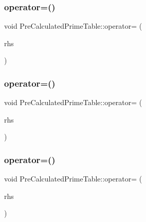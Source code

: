 \subsubsection{\texorpdfstring{operator=()}{operator=()}\hspace{0.1cm}{\footnotesize\ttfamily [1/3]}}
{\footnotesize\ttfamily void Pre\+Calculated\+Prime\+Table\+::operator= (\begin{DoxyParamCaption}\item[{const \mbox{\hyperlink{class_pre_calculated_prime_table}{Pre\+Calculated\+Prime\+Table}} \&}]{rhs }\end{DoxyParamCaption})\hspace{0.3cm}{\ttfamily [private]}}

\mbox{\label{class_pre_calculated_prime_table_a67012c43b78cee27b891a9934becc455}} 
\subsubsection{\texorpdfstring{operator=()}{operator=()}\hspace{0.1cm}{\footnotesize\ttfamily [2/3]}}
{\footnotesize\ttfamily void Pre\+Calculated\+Prime\+Table\+::operator= (\begin{DoxyParamCaption}\item[{const \mbox{\hyperlink{class_pre_calculated_prime_table}{Pre\+Calculated\+Prime\+Table}} \&}]{rhs }\end{DoxyParamCaption})\hspace{0.3cm}{\ttfamily [private]}}

\mbox{\label{class_pre_calculated_prime_table_a67012c43b78cee27b891a9934becc455}} 
\subsubsection{\texorpdfstring{operator=()}{operator=()}\hspace{0.1cm}{\footnotesize\ttfamily [3/3]}}
{\footnotesize\ttfamily void Pre\+Calculated\+Prime\+Table\+::operator= (\begin{DoxyParamCaption}\item[{const \mbox{\hyperlink{class_pre_calculated_prime_table}{Pre\+Calculated\+Prime\+Table}} \&}]{rhs }\end{DoxyParamCaption})\hspace{0.3cm}{\ttfamily [private]}}




